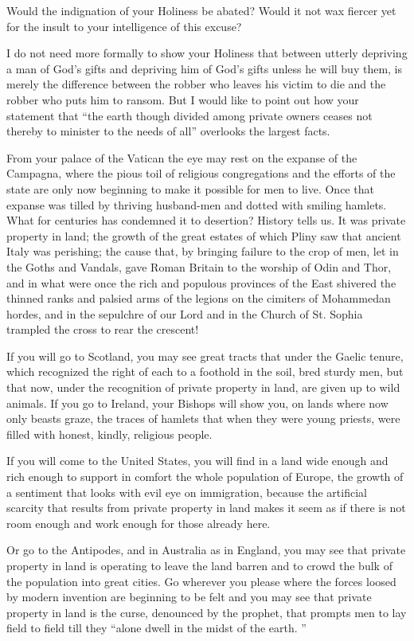 \documentclass{book}
\begin{document}
Would the indignation of your Holiness be abated? Would it not wax fiercer yet for the insult to your intelligence of this excuse?

I do not need more formally to show your Holiness that between utterly depriving a man of God’s gifts and depriving him of God’s gifts unless he will buy them, is merely the difference between the robber who leaves his victim to die and the robber who puts him to ransom. But I would like to point out how your statement that “the earth though divided among private owners ceases not thereby to minister to the needs of all” overlooks the largest facts.

From your palace of the Vatican the eye may rest on the expanse of the Campagna, where the pious toil of religious congregations and the efforts of the state are only now beginning to make it possible for men to live. Once that expanse was tilled by thriving husband-men and dotted with smiling hamlets. What for centuries has condemned it to desertion? History tells us. It was private property in land; the growth of the great estates of which Pliny saw that ancient Italy was perishing; the cause that, by bringing failure to the crop of men, let in the Goths and Vandals, gave Roman Britain to the worship of Odin and Thor, and in what were once the rich and populous provinces of the East shivered the thinned ranks and palsied arms of the legions on the cimiters of Mohammedan hordes, and in the sepulchre of our Lord and in the Church of St. Sophia trampled the cross to rear the crescent!

If you will go to Scotland, you may see great tracts that under the Gaelic tenure, which recognized the right of each to a foothold in the soil, bred sturdy men, but that now, under the recognition of private property in land, are given up to wild animals. If you go to Ireland, your Bishops will show you, on lands where now only beasts graze, the traces of hamlets that when they were young priests, were filled with honest, kindly, religious people.\footnotemark[2]

If you will come to the United States, you will find in a land wide enough and rich enough to support in comfort the whole population of Europe, the growth of a sentiment that looks with evil eye on immigration, because the artificial scarcity that results from private property in land makes it seem as if there is not room enough and work enough for those already here.

Or go to the Antipodes, and in Australia as in England, you may see that private property in land is operating to leave the land barren and to crowd the bulk of the population into great cities. Go wherever you please where the forces loosed by modern invention are beginning to be felt and you may see that private property in land is the curse, denounced by the prophet, that prompts men to lay field to field till they “alone dwell in the midst of the earth. ”
\end{document}
